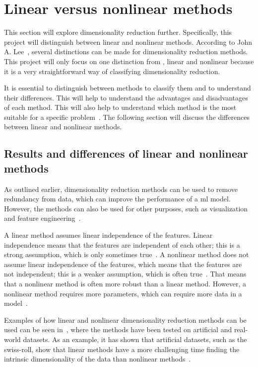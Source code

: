 \section{Linear versus nonlinear methods}\label{sec:linear-vs-nonlinear}

This section will explore dimensionality reduction further. Specifically, this project will distinguish between linear and nonlinear methods. According to John A. Lee~\cite{nonlinear-dim-red-chapter-two}, several distinctions can be made for dimensionality reduction methods. This project will only focus on one distinction from \cite{nonlinear-dim-red-chapter-two}, linear and nonlinear because it is a very straightforward way of classifying dimensionality reduction.

It is essential to distinguish between methods to classify them and to understand their differences. This will help to understand the advantages and disadvantages of each method. This will also help to understand which method is the most suitable for a specific problem~\cite{nonlinear-dim-red-chapter-two}. The following section will discuss the differences between linear and nonlinear methods.


\subsection{Results and differences of linear and nonlinear methods}
As outlined earlier, dimensionality reduction methods can be used to remove redundancy from data, which can improve the performance of a \gls{ml} model. However, the methods can also be used for other purposes, such as visualization and feature engineering~\cite{nonlinear-dim-red-chapter-two}.

A linear method assumes linear independence of the features. Linear independence means that the features are independent of each other; this is a strong assumption, which is only sometimes true~\cite{linear-algebra-margalit}. A nonlinear method does not assume linear independence of the features, which means that the features are not independent; this is a weaker assumption, which is often true~\cite{avriel2003nonlinear}. That means that a nonlinear method is often more robust than a linear method. However, a nonlinear method requires more parameters, which can require more data in a model~\cite{nonlinear-dim-red-chapter-two}.

Examples of how linear and nonlinear dimensionality reduction methods can be used can be seen in~\cite{dimensionality-reduction-comparative-review, tennenbaum}, where the methods have been tested on artificial and real-world datasets. As an example, it has shown that artificial datasets, such as the swiss-roll, show that linear methods have a more challenging time finding the intrinsic dimensionality of the data than nonlinear methods~\cite{tennenbaum}.

